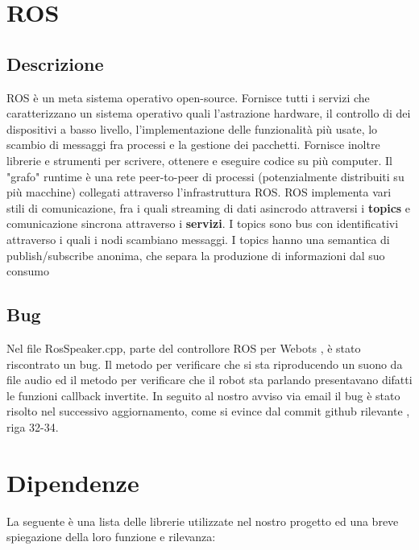 \documentclass[a4paper]{article}
\begin{document}
	\section{ROS}\label{sec:Ros}
	
	\subsection{Descrizione}\label{sec:Descrizione}
	ROS \cite{ros.org} è un meta sistema operativo open-source. Fornisce tutti i servizi che caratterizzano un sistema operativo quali l'astrazione hardware, il controllo di dei dispositivi a basso livello, l'implementazione delle funzionalità più usate, lo scambio di messaggi fra processi e la gestione dei pacchetti. Fornisce inoltre librerie e strumenti per scrivere, ottenere e eseguire codice su più computer. Il "grafo" runtime è una rete peer-to-peer di processi (potenzialmente distribuiti su più macchine) collegati attraverso l'infrastruttura ROS. ROS implementa vari stili di comunicazione, fra i quali streaming di dati asincrodo attraversi i \textbf{topics} e comunicazione sincrona attraverso i \textbf{servizi}. 
	I topics sono bus con identificativi attraverso i quali i nodi scambiano messaggi. I topics hanno una semantica di publish/subscribe anonima, che separa la produzione di informazioni dal suo consumo 
	
	\subsection{Bug}\label{sec:Bug}
	Nel file RosSpeaker.cpp, parte del controllore ROS per Webots \cite{cyberbotics}, è stato riscontrato un bug. Il metodo per verificare che si sta riproducendo un suono da file audio ed il metodo per verificare che il robot sta parlando presentavano difatti le funzioni callback invertite. In seguito al nostro avviso via email il bug è stato risolto nel successivo aggiornamento, come si evince dal commit github rilevante \cite{rosbug}, riga 32-34.
	
	\section{Dipendenze}\label{sec:Dipendenze} 
	La seguente è una lista delle librerie utilizzate nel nostro progetto ed una breve spiegazione della loro funzione e rilevanza:
	
\end{document}
